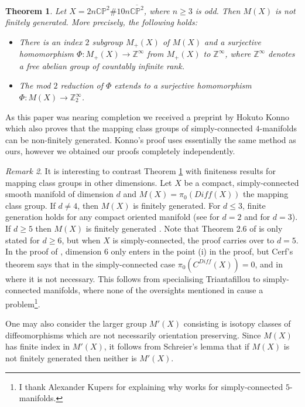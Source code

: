 \documentclass{amsart}
\newtheorem{theorem}{Theorem}[section]
\theoremstyle{definition}
\theoremstyle{remark}
\newtheorem{remark}[theorem]{Remark}
\numberwithin{equation}{section}
\begin{document}
\begin{theorem}\label{thm:nfg0}
Let $X = 2n \mathbb{CP}^2 \# 10n \overline{\mathbb{CP}^2}$, where $n \ge 3$ is odd. Then $M(X)$ is not finitely generated. More precisely, the following holds:
\begin{itemize}
\item[(1)]{There is an index $2$ subgroup $M_+(X)$ of $M(X)$ and a surjective homomorphism $\Phi : M_+(X) \to \mathbb{Z}^\infty$ from $M_+(X)$ to $\mathbb{Z}^{\infty}$, where $\mathbb{Z}^{\infty}$ denotes a free abelian group of countably infinite rank.}
\item[(2)]{The mod $2$ reduction of $\Phi$ extends to a surjective homomorphism $\Phi : M(X) \to \mathbb{Z}_2^\infty$.}
\end{itemize}
\end{theorem}

As this paper was nearing completion we received a preprint by Hokuto Konno \cite{kon} which also proves that the mapping class groups of simply-connected $4$-manifolds can be non-finitely generated. Konno's proof uses essentially the same method as ours, however we obtained our proofs completely independently. 


\begin{remark}
It is interesting to contrast Theorem \ref{thm:nfg0} with finiteness results for mapping class groups in other dimensions. Let $X$ be a compact, simply-connected smooth manifold of dimension $d$ and $M(X) = \pi_0(Diff(X))$ the mapping class group. If $d \neq 4$, then $M(X)$ is finitely generated. For $d \le 3$, finite generation holds for any compact oriented manifold (see \cite{dehn} for $d=2$ and \cite{hm} for $d=3$). If $d \ge 5$ then $M(X)$ is finitely generated \cite[Theorem 2.6]{bkk}. Note that Theorem 2.6 of \cite{bkk} is only stated for $d \ge 6$, but when $X$ is simply-connected, the proof carries over to $d=5$. In the proof of \cite[Theorem 2.6]{bkk}, dimension $6$ only enters in the point (i) in the proof, but Cerf's theorem says that in the simply-connected case $\pi_0(C^{Diff}(X)) = 0$, and in \cite[Proposition 2.7]{bkk} where it is not necessary. This follows from specialising Triantafillou \cite{tri} to simply-connected manifolds, where none of the oversights mentioned in \cite[]{bkk} cause a problem\footnote{I thank Alexander Kupers for explaining why \cite[Theorem 2.6]{bkk} works for simply-connected $5$-manifolds.}.

One may also consider the larger group $M'(X)$ consisting is isotopy classes of diffeomorphisms which are not necessarily orientation preserving. Since $M(X)$ has finite index in $M'(X)$, it follows from Schreier's lemma \cite{ser} that if $M(X)$ is not finitely generated then neither is $M'(X)$.
\end{remark}
\end{document}
